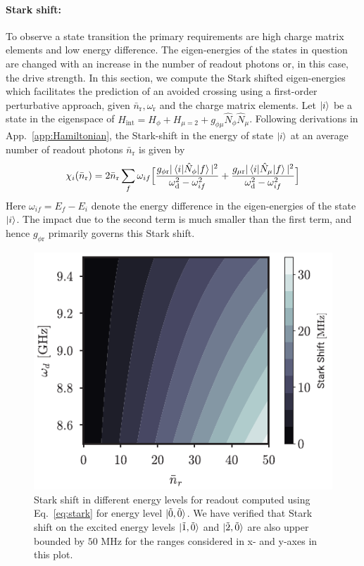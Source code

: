 \documentclass[%
reprint,
superscriptaddress,
 amsmath,amssymb,
 aps,
 prx,
longbibliography,
floatfix,
]{revtex4-2}
\begin{document}
{\paragraph{Stark shift:}\label{app:stark-shift}
To observe a state transition the primary requirements are high charge matrix elements and low energy difference. The eigen-energies of the states in question are changed with an increase in the number of readout photons or, in this case, the drive strength. In this section, we compute the Stark shifted eigen-energies which facilitates the prediction of an avoided crossing using a first-order perturbative approach, given $\bar n_\textrm{r}, \omega_\textrm{r}$ and the charge matrix elements.  Let $\ket{i}$ be a state in the eigenspace of $H_{\textrm{int}}=H_\phi+H_{\mu=2}+g_{\phi\mu}\hat N_\phi\hat N_\mu$. Following derivations in App.~\ref{app:Hamiltonian}, the Stark-shift in the energy of state $\ket{i}$ at an average number of readout photons $\bar n_\textrm{r}$ is given by
\begin{align}
    \chi_i(\bar n_\textrm{r})=2\bar n_\textrm{r}\sum_{f}\omega_{if}\Big[\frac{g_{\phi \textrm{r}}|\braket{i|\hat N_\phi|f}|^2}{\omega_\textrm{d}^2-\omega_{if}^2}+\frac{g_{\mu \textrm{r}}|\braket{i|\hat N_\mu|f}|^2}{\omega_\textrm{d}^2-\omega_{if}^2}\Big]\label{eq:stark}
\end{align}
 Here $\omega_{if}=E_f-E_i$ denote the energy difference in the eigen-energies of the state $\ket{i}$. The impact due to the second term is much smaller than the first term, and hence $g_{\phi \textrm{r}}$ primarily governs this Stark shift.
 \begin{figure}
     \centering
     \includegraphics[width=\linewidth]{Supp_Fig/Stark-shift.pdf}
     \caption{Stark shift in different energy levels for readout computed using Eq.~\ref{eq:stark} for energy level $\ket{\tilde{0},\tilde{0}}$. We have verified that Stark shift on the excited energy levels $\ket{\tilde{1},\tilde{0}}$ and $\ket{\tilde{2},\tilde{0}}$ are also upper bounded by $50$ MHz for the ranges considered in x- and y-axes in this plot.}
     \label{fig:stark-shift}
 \end{figure}

}
\end{document}
